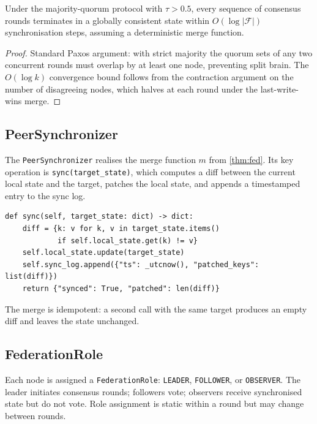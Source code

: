 \documentclass[11pt]{article}
\begin{document}
\begin{theorem}\label{thm:fed}
Under the majority-quorum protocol with $\tau > 0.5$, every sequence of
consensus rounds terminates in a globally consistent state within
$O(\log |\mathcal{F}|)$ synchronisation steps, assuming a deterministic
merge function.
\end{theorem}
\begin{proof}
Standard Paxos argument: with strict majority the quorum sets of any two
concurrent rounds must overlap by at least one node, preventing split brain.
The $O(\log k)$ convergence bound follows from the contraction argument on
the number of disagreeing nodes, which halves at each round under the
last-write-wins merge.
\end{proof}

\subsection{PeerSynchronizer}

The \texttt{PeerSynchronizer} realises the merge function $m$ from
\cref{thm:fed}.  Its key operation is \texttt{sync(target\_state)}, which
computes a diff between the current local state and the target, patches the
local state, and appends a timestamped entry to the sync log.

\begin{lstlisting}[style=jugeo-python, caption={PeerSynchronizer.sync method (simplified).}]
def sync(self, target_state: dict) -> dict:
    diff = {k: v for k, v in target_state.items()
            if self.local_state.get(k) != v}
    self.local_state.update(target_state)
    self.sync_log.append({"ts": _utcnow(), "patched_keys": list(diff)})
    return {"synced": True, "patched": len(diff)}
\end{lstlisting}

The merge is idempotent: a second call with the same target produces an
empty diff and leaves the state unchanged.

\subsection{FederationRole}

Each node is assigned a \texttt{FederationRole}: \texttt{LEADER},
\texttt{FOLLOWER}, or \texttt{OBSERVER}.  The leader initiates consensus
rounds; followers vote; observers receive synchronised state but do not vote.
Role assignment is static within a round but may change between rounds.
\end{document}
